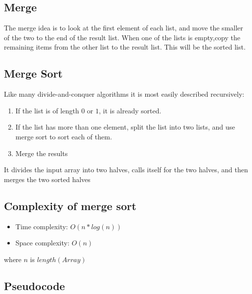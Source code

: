 \documentclass{article}
\begin{document}
\subsection{Merge}

The merge idea is to look at the first element of each list, and move the smaller of the two to the end of the result list. When one of the lists is empty,copy the remaining items from the other list to the result list. This will be the sorted list.

\subsection{Merge Sort}

Like many divide-and-conquer algorithms it is most easily described recursively: 
\begin{enumerate}
\item  If the list is of length $0$ or $1$, it is already sorted.
\item  If the list has more than one element, split the list into two lists, and use merge sort to sort each of them.
\item  Merge the results
\end{enumerate}

It divides the input array into two halves, calls itself for the two halves, and then merges the two sorted halves

\subsection{Complexity of merge sort} 

\begin{itemize}
    \item Time complexity: $O(n*log(n))$
    \item Space complexity: $O(n)$
\end{itemize}
where $n$ is $length(Array)$

\subsection{Pseudocode} 
\end{document}
